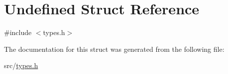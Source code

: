 \hypertarget{struct_undefined}{}\section{Undefined Struct Reference}
\label{struct_undefined}


{\ttfamily \#include $<$types.\+h$>$}



The documentation for this struct was generated from the following file\+:\begin{DoxyCompactItemize}
\item 
src/\hyperlink{types_8h}{types.\+h}\end{DoxyCompactItemize}
